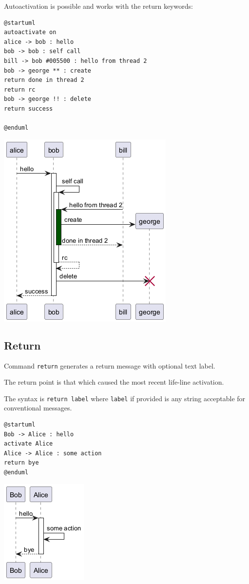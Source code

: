 Autoactivation is possible and works with the return keywords:


\begin{verbatim}
@startuml
autoactivate on
alice -> bob : hello
bob -> bob : self call
bill -> bob #005500 : hello from thread 2
bob -> george ** : create
return done in thread 2
return rc
bob -> george !! : delete
return success

@enduml
\end{verbatim}
\begin{center}
\includegraphics[scale=0.60]{imgw/img-7b885e37c75d99046f1aa7a4898b3993.png}
\end{center}
%
%
\subsection{Return}


Command \texttt{return} generates a return message with optional text label.


The return point is that which caused the most recent life-line activation.


The syntax is \texttt{return label} where \texttt{label} if provided is any string acceptable for conventional messages.




\begin{verbatim}
@startuml
Bob -> Alice : hello
activate Alice
Alice -> Alice : some action
return bye
@enduml
\end{verbatim}
\begin{center}
\includegraphics[scale=0.60]{imgw/img-7d491cd723e8d6f752bd0f45b9cf763b.png}
\end{center}


